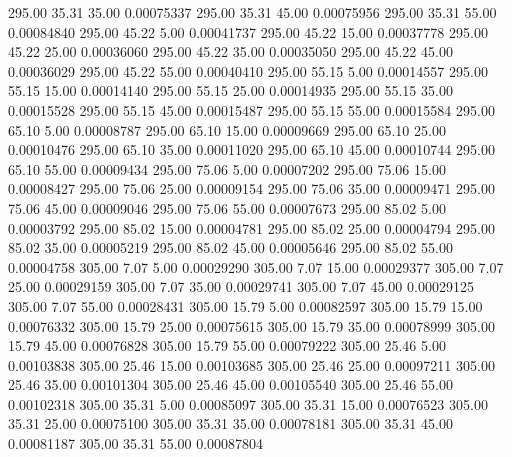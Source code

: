     295.00     35.31     35.00     0.00075337
    295.00     35.31     45.00     0.00075956
    295.00     35.31     55.00     0.00084840
    295.00     45.22      5.00     0.00041737
    295.00     45.22     15.00     0.00037778
    295.00     45.22     25.00     0.00036060
    295.00     45.22     35.00     0.00035050
    295.00     45.22     45.00     0.00036029
    295.00     45.22     55.00     0.00040410
    295.00     55.15      5.00     0.00014557
    295.00     55.15     15.00     0.00014140
    295.00     55.15     25.00     0.00014935
    295.00     55.15     35.00     0.00015528
    295.00     55.15     45.00     0.00015487
    295.00     55.15     55.00     0.00015584
    295.00     65.10      5.00     0.00008787
    295.00     65.10     15.00     0.00009669
    295.00     65.10     25.00     0.00010476
    295.00     65.10     35.00     0.00011020
    295.00     65.10     45.00     0.00010744
    295.00     65.10     55.00     0.00009434
    295.00     75.06      5.00     0.00007202
    295.00     75.06     15.00     0.00008427
    295.00     75.06     25.00     0.00009154
    295.00     75.06     35.00     0.00009471
    295.00     75.06     45.00     0.00009046
    295.00     75.06     55.00     0.00007673
    295.00     85.02      5.00     0.00003792
    295.00     85.02     15.00     0.00004781
    295.00     85.02     25.00     0.00004794
    295.00     85.02     35.00     0.00005219
    295.00     85.02     45.00     0.00005646
    295.00     85.02     55.00     0.00004758
    305.00      7.07      5.00     0.00029290
    305.00      7.07     15.00     0.00029377
    305.00      7.07     25.00     0.00029159
    305.00      7.07     35.00     0.00029741
    305.00      7.07     45.00     0.00029125
    305.00      7.07     55.00     0.00028431
    305.00     15.79      5.00     0.00082597
    305.00     15.79     15.00     0.00076332
    305.00     15.79     25.00     0.00075615
    305.00     15.79     35.00     0.00078999
    305.00     15.79     45.00     0.00076828
    305.00     15.79     55.00     0.00079222
    305.00     25.46      5.00     0.00103838
    305.00     25.46     15.00     0.00103685
    305.00     25.46     25.00     0.00097211
    305.00     25.46     35.00     0.00101304
    305.00     25.46     45.00     0.00105540
    305.00     25.46     55.00     0.00102318
    305.00     35.31      5.00     0.00085097
    305.00     35.31     15.00     0.00076523
    305.00     35.31     25.00     0.00075100
    305.00     35.31     35.00     0.00078181
    305.00     35.31     45.00     0.00081187
    305.00     35.31     55.00     0.00087804
